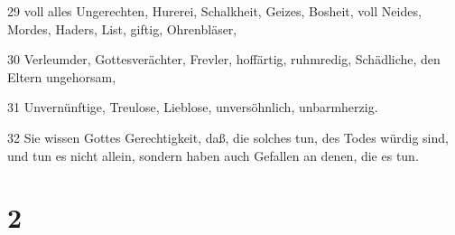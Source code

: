 \par 29 voll alles Ungerechten, Hurerei, Schalkheit, Geizes, Bosheit, voll Neides, Mordes, Haders, List, giftig, Ohrenbläser,
\par 30 Verleumder, Gottesverächter, Frevler, hoffärtig, ruhmredig, Schädliche, den Eltern ungehorsam,
\par 31 Unvernünftige, Treulose, Lieblose, unversöhnlich, unbarmherzig.
\par 32 Sie wissen Gottes Gerechtigkeit, daß, die solches tun, des Todes würdig sind, und tun es nicht allein, sondern haben auch Gefallen an denen, die es tun.

\chapter{2}

